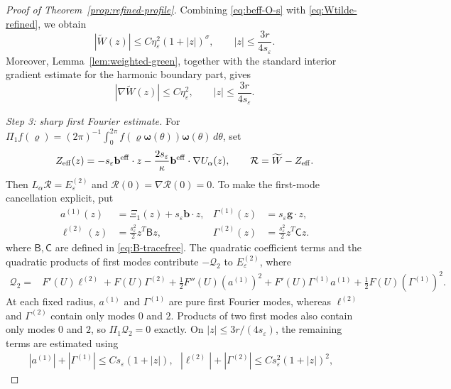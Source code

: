\documentclass[11pt,reqno]{amsart}
\numberwithin{equation}{section}
\theoremstyle{definition}
\theoremstyle{remark}
\newcommand{\eps}{\varepsilon}
\begin{document}
\begin{proof}[Proof of Theorem~\ref{prop:refined-profile}]
Combining \eqref{eq:beff-O-s} with
\eqref{eq:Wtilde-refined}, we obtain
\begin{equation}
  |\widetilde W(z)|
  \le
  C\eta_\eps^2(1+|z|)^\sigma,
  \qquad
  |z|\le\frac{3r}{4s_\eps}.
  \label{eq:Wtilde-O2-weighted}
\end{equation}
Moreover, Lemma~\ref{lem:weighted-green}, together with the standard
interior gradient estimate for the harmonic boundary part, gives
\begin{equation}
  |\nabla\widetilde W(z)|
  \le
  C\eta_\eps^2,
  \qquad
  |z|\le\frac{3r}{4s_\eps}.
  \label{eq:grad-Wtilde-O2}
\end{equation}

\medskip
\noindent
{ 
\emph{Step 3: sharp first Fourier estimate.}
}
For $\Pi_1f(\varrho)=(2\pi)^{-1}\int_0^{2\pi}
f(\varrho \boldsymbol\omega(\theta))\boldsymbol\omega(\theta)\,d\theta$, set
\begin{equation}\label{eq:P1-definition}
 Z_{\rm eff}(z)=-s_\eps \mathbf{b}^{\rm eff}\cdot z
 -\frac{2s_\eps}{\kappa}\mathbf{b}^{\rm eff}\cdot\nabla U_\alpha(z),
 \qquad \mathcal R=\widetilde W-Z_{\rm eff}.
\end{equation}
Then $L_\alpha\mathcal R=E_\eps^{(2)}$ and
$\mathcal R(0)=\nabla\mathcal R(0)=0$.
To make the first-mode cancellation explicit, put
\[
 \begin{aligned}
 a^{(1)}(z)&=\Xi_1(z)+s_\eps\mathbf b\cdot z,
 &\Gamma^{(1)}(z)&=s_\eps\mathbf g\cdot z,\\
 \ell^{(2)}(z)&=\frac{s_\eps^2}{2}z^T\mathsf Bz,
 &\Gamma^{(2)}(z)&=\frac{s_\eps^2}{2}z^T\mathsf Cz.
 \end{aligned}
\]
where $\mathsf B,\mathsf C$ are defined in \eqref{eq:B-tracefree}.
The quadratic coefficient terms and the quadratic products of first
modes contribute $-\mathcal Q_2$ to $E_\eps^{(2)}$, where
\[
 \begin{aligned}
 \mathcal Q_2={}&F'(U)\ell^{(2)}+F(U)\Gamma^{(2)}
  +\frac12F''(U)(a^{(1)})^2 +F'(U)\Gamma^{(1)}a^{(1)}
  +\frac12F(U)(\Gamma^{(1)})^2.
 \end{aligned}
\]
At each fixed radius, $a^{(1)}$ and $\Gamma^{(1)}$ are pure first
Fourier modes, whereas $\ell^{(2)}$ and $\Gamma^{(2)}$ contain only
modes $0$ and $2$. Products of two first modes also contain only
modes $0$ and $2$, so $\Pi_1\mathcal Q_2=0$ exactly.
On $|z|\le3r/(4s_\eps)$, the remaining terms are estimated using
\[
 \begin{aligned}
 |a^{(1)}|+|\Gamma^{(1)}|\le Cs_\eps(1+|z|),\ \ \
 |\ell^{(2)}|+|\Gamma^{(2)}|\le Cs_\eps^2(1+|z|)^2,\ \ \

\end{aligned}\]
\end{proof}
\end{document}
